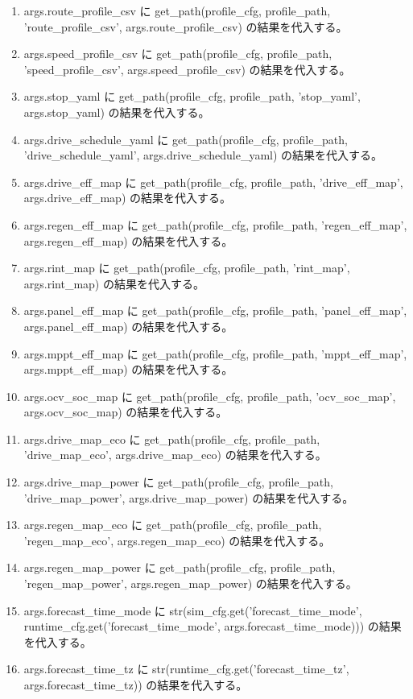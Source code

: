 \documentclass[a4paper,11pt]{article}
\begin{document}
\begin{enumerate}[leftmargin=1.8em]
\item args.route\_profile\_csv に get\_path(profile\_cfg, profile\_path, 'route\_profile\_csv', args.route\_profile\_csv) の結果を代入する。
\item args.speed\_profile\_csv に get\_path(profile\_cfg, profile\_path, 'speed\_profile\_csv', args.speed\_profile\_csv) の結果を代入する。
\item args.stop\_yaml に get\_path(profile\_cfg, profile\_path, 'stop\_yaml', args.stop\_yaml) の結果を代入する。
\item args.drive\_schedule\_yaml に get\_path(profile\_cfg, profile\_path, 'drive\_schedule\_yaml', args.drive\_schedule\_yaml) の結果を代入する。
\item args.drive\_eff\_map に get\_path(profile\_cfg, profile\_path, 'drive\_eff\_map', args.drive\_eff\_map) の結果を代入する。
\item args.regen\_eff\_map に get\_path(profile\_cfg, profile\_path, 'regen\_eff\_map', args.regen\_eff\_map) の結果を代入する。
\item args.rint\_map に get\_path(profile\_cfg, profile\_path, 'rint\_map', args.rint\_map) の結果を代入する。
\item args.panel\_eff\_map に get\_path(profile\_cfg, profile\_path, 'panel\_eff\_map', args.panel\_eff\_map) の結果を代入する。
\item args.mppt\_eff\_map に get\_path(profile\_cfg, profile\_path, 'mppt\_eff\_map', args.mppt\_eff\_map) の結果を代入する。
\item args.ocv\_soc\_map に get\_path(profile\_cfg, profile\_path, 'ocv\_soc\_map', args.ocv\_soc\_map) の結果を代入する。
\item args.drive\_map\_eco に get\_path(profile\_cfg, profile\_path, 'drive\_map\_eco', args.drive\_map\_eco) の結果を代入する。
\item args.drive\_map\_power に get\_path(profile\_cfg, profile\_path, 'drive\_map\_power', args.drive\_map\_power) の結果を代入する。
\item args.regen\_map\_eco に get\_path(profile\_cfg, profile\_path, 'regen\_map\_eco', args.regen\_map\_eco) の結果を代入する。
\item args.regen\_map\_power に get\_path(profile\_cfg, profile\_path, 'regen\_map\_power', args.regen\_map\_power) の結果を代入する。
\item args.forecast\_time\_mode に str(sim\_cfg.get('forecast\_time\_mode', runtime\_cfg.get('forecast\_time\_mode', args.forecast\_time\_mode))) の結果を代入する。
\item args.forecast\_time\_tz に str(runtime\_cfg.get('forecast\_time\_tz', args.forecast\_time\_tz)) の結果を代入する。

\end{enumerate}
\end{document}
